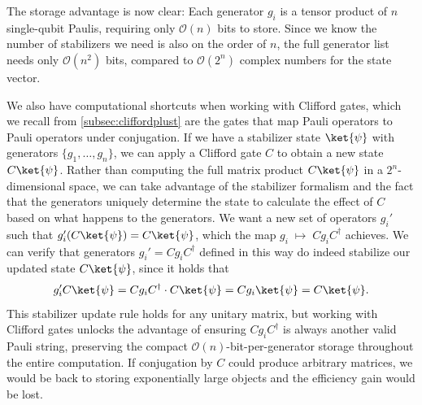 \begin{center}
\end{center}

The storage advantage is now clear: Each generator $g_i$ is a tensor product of $n$ single-qubit Paulis, requiring only $\mathcal{O}(n)$ bits to store. Since we know the number of stabilizers we need is also on the order of $n$, the full generator list needs only $\mathcal{O}(n^2)$ bits, compared to $\mathcal{O}(2^n)$ complex numbers for the state vector. 

We also have computational shortcuts when working with Clifford gates, which we recall from \cref{subsec:cliffordplust} are the gates that map Pauli operators to Pauli operators under conjugation. If we have a stabilizer state $\ket{\psi}$ with generators $\{g_1, \ldots, g_n\}$, we can apply a Clifford gate $C$ to obtain a new state $C\ket{\psi}$. Rather than computing the full matrix product $C\ket{\psi}$ in a $2^n$-dimensional space, we can take advantage of the stabilizer formalism and the fact that the generators uniquely determine the state to calculate the effect of $C$ based on what happens to the generators. We want a new set of operators $g_i'$ such that $g_i'(C\ket{\psi}) = C\ket{\psi}$, which the map $ g_i \;\mapsto\; Cg_iC^\dagger$ achieves. We can verify that generators $g_i' = Cg_iC^\dagger$ defined in this way do indeed stabilize our updated state $C\ket{\psi}$, since it holds that
\[g_i'C\ket{\psi} = Cg_iC^\dagger \cdot C\ket{\psi} = Cg_i\ket{\psi} = C\ket{\psi}.\]
This stabilizer update rule holds for any unitary matrix, but working with Clifford gates unlocks the advantage of ensuring $Cg_iC^\dagger$ is always another valid Pauli string, preserving the compact $\mathcal{O}(n)$-bit-per-generator storage throughout the entire computation. If conjugation by $C$ could produce arbitrary matrices, we would be back to storing exponentially large objects and the efficiency gain would be lost.

